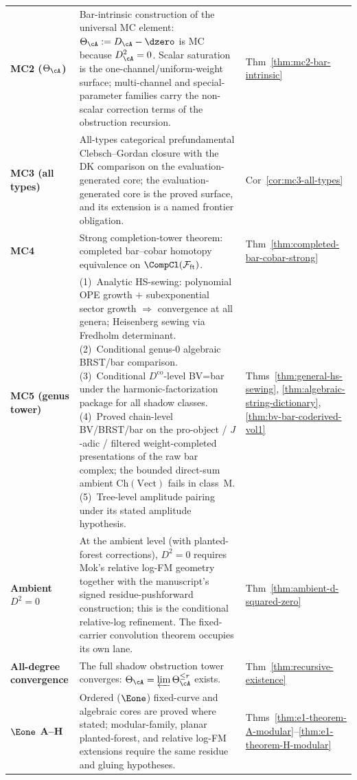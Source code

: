 \begin{longtable}{@{}p{2.2cm}p{7.7cm}p{3.0cm}@{}}
\textbf{MC2 ($\Theta_\cA$)} &
 Bar-intrinsic construction of the universal MC element:
 $\Theta_\cA := D_\cA - \dzero$ is MC because $D_\cA^2 = 0$.
 Scalar saturation is the one-channel/uniform-weight surface; multi-channel
 and special-parameter families carry the non-scalar correction terms of
 the obstruction recursion. &
 Thm~\ref{thm:mc2-bar-intrinsic} \\[4pt]

\textbf{MC3 (all types)} &
 All-types categorical prefundamental Clebsch--Gordan closure
 with the DK comparison on the evaluation-generated core; the
 evaluation-generated core is the proved surface, and its extension is
 a named frontier obligation. &
 Cor~\ref{cor:mc3-all-types} \\[4pt]

\textbf{MC4} &
 Strong completion-tower theorem:
 completed bar--cobar homotopy equivalence on
 $\CompCl(\mathcal{F}_{\mathrm{ft}})$. &
 Thm~\ref{thm:completed-bar-cobar-strong} \\[4pt]

\textbf{MC5 (genus tower)} &
 (1)~Analytic HS-sewing: polynomial OPE growth $+$
 subexponential sector growth $\Longrightarrow$ convergence at
 all genera; Heisenberg sewing via Fredholm determinant.
 (2)~Conditional genus-$0$ algebraic BRST/bar comparison.
 (3)~Conditional $D^{\mathrm{co}}$-level BV=bar under the
 harmonic-factorization package for all shadow classes.
 (4)~Proved chain-level BV/BRST/bar on the pro-object / $J$-adic /
 filtered weight-completed presentations of the raw bar complex; the bounded
 direct-sum ambient $\mathrm{Ch}(\mathrm{Vect})$ fails in class~M.
 (5)~Tree-level amplitude pairing under its stated amplitude hypothesis. &
 Thms~\ref{thm:general-hs-sewing},
 \ref{thm:algebraic-string-dictionary},
 \ref{thm:bv-bar-coderived-vol1} \\[4pt]

\textbf{Ambient $D^2 = 0$} &
At the ambient level (with planted-forest corrections),
$D^2 = 0$ requires Mok's relative log-FM geometry together with the
manuscript's signed residue-pushforward construction; this is the
conditional relative-log refinement.  The fixed-carrier convolution
theorem occupies its own lane. &
Thm~\ref{thm:ambient-d-squared-zero} \\[4pt]

\textbf{All-degree convergence} &
 The full shadow obstruction tower converges:
 $\Theta_\cA = \varprojlim \Theta_\cA^{\le r}$ exists. &
 Thm~\ref{thm:recursive-existence} \\[4pt]

\textbf{$\Eone$ A--H} &
Ordered ($\Eone$) fixed-curve and algebraic cores are proved where
stated; modular-family, planar planted-forest, and relative log-FM
extensions require the same residue and gluing hypotheses. &
Thms~\ref{thm:e1-theorem-A-modular}--\ref{thm:e1-theorem-H-modular} \\[4pt]
\end{longtable}

